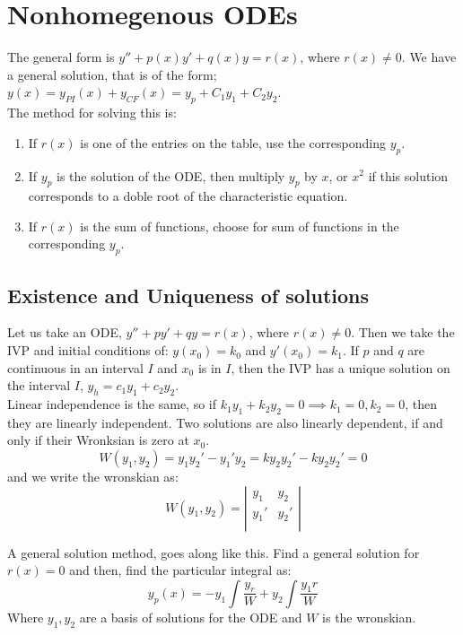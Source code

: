 \documentclass{article}
\begin{document}
\section{Nonhomegenous ODEs}
The general form is $y'' + p(x)y' + q(x)y = r(x)$, where $r(x) \neq 0$. We have a general solution, that is of the form; $y(x) = y_{PI}(x) + y_{CF}(x) = y_p + C_1y_1 + C_2y_2$.\\

The method for solving this is:
\begin{enumerate}
  \item If $r(x)$ is one of the entries on the table, use the corresponding $y_p$.
  \item If $y_p$ is the solution of the ODE, then multiply $y_p$ by $x$, or $x^2$ if this solution corresponds to a doble root of the characteristic equation.
  \item If $r(x)$ is the sum of functions, choose for sum of functions in the corresponding $y_p$.
\end{enumerate}

\subsection{Existence and Uniqueness of solutions}

Let us take an ODE, $y'' + py' + qy = r(x)$, where $r(x) \neq 0$. Then we take the IVP and initial conditions of: $y(x_0) = k_0$ and $y'(x_0) = k_1$. If $p$ and $q$ are continuous in an interval $I$ and $x_0$ is in $I$, then the IVP has a unique solution on the interval $I$, $y_h = c_1y_1 + c_2y_2$.\\

\noindent
Linear independence is the same, so if $k_1y_1 + k_2y_2 = 0 \implies k_1=0, k_2=0$, then they are linearly independent. Two solutions are also linearly dependent, if and only if their Wronksian is zero at $x_0$.
$$ W(y_1, y_2) = y_1y_2' - y_1'y_2 = ky_2y_2' - ky_2y_2' = 0 $$
and we write the wronskian as:
$$ W(y_1, y_2) =
\left|\begin{matrix}
  y_1 & y_2 \\
  y_1' & y_2' \\
\end{matrix}\right| $$

A general solution method, goes along like this. Find a general solution for $r(x) = 0$ and then, find the particular integral as:
$$ y_p(x) = -y_1\int{\frac{y_r}{W}} + y_2\int{\frac{y_1 r}{W}} $$
Where $y_1, y_2$ are a basis of solutions for the ODE and $W$ is the wronskian.
\end{document}
